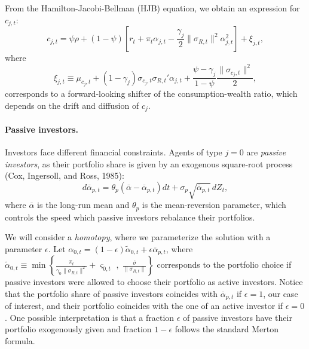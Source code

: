 \documentclass[12pt,english]{article}
\begin{document}
From the Hamilton-Jacobi-Bellman (HJB) equation, we obtain an expression for $c_{j,t}$:
\begin{equation}\label{eq:xi_j}
	c_{j,t} = \psi \rho + (1-\psi) \left[ r_t + \pi_t \alpha_{j,t} - \frac{\gamma_j}{2} \|\sigma_{R,t}\|^2 \alpha_{j,t}^2\right] + \xi_{j,t},
\end{equation}
where 
\begin{equation}\label{eq:shifter}
	\xi_{j,t} \equiv \mu_{c_j,t} + (1-\gamma_j)  \sigma_{c_j,t} \sigma_{R,t}' \alpha_{j,t} + \frac{\psi - \gamma_j}{1-\psi} \frac{\|\sigma_{c_j,t}\|^2}{2},
\end{equation} corresponds to a forward-looking shifter of the consumption-wealth ratio, which depends on the drift and diffusion of $c_j$.

\paragraph{Passive investors.} Investors face different financial constraints. Agents of type $j = 0 $ are \textit{passive investors}, as their portfolio share is given by an exogenous square-root process (Cox, Ingersoll, and Ross, 1985):
\begin{equation}\label{eq:alpha_p_process}
	d \overline{\alpha}_{p,t} = \theta_p (\overline{\alpha} - \overline{\alpha}_{p,t}) dt + \sigma_{p} \sqrt{\overline{\alpha}_{p,t}}\, d Z_t,
\end{equation}
where $\overline{\alpha}$ is the long-run mean and $\theta_p$ is the mean-reversion parameter, which controls the speed which passive investors rebalance their portfolios. 

We will consider a \textit{homotopy}, where we parameterize the solution with a parameter $\epsilon$. 
Let $\alpha_{0,t} = (1-\epsilon) \tilde{\alpha}_{0,t} + \epsilon \overline{\alpha}_{p,t}$, where 
$\tilde{\alpha}_{0,t} \equiv \min \left\{ \frac{\pi_t}{\gamma_0 \|\sigma_{R,t}\|^2}  + \varsigma_{0,t}\,\,, \,\,\frac{\overline{\sigma}}{\|\sigma_{R,t}\|} \right\}$ corresponds to the portfolio choice if passive investors were allowed to choose their portfolio as active investors. 
Notice that the portfolio share of passive investors coincides with $\overline{\alpha}_{p,t}$ if $\epsilon = 1$, our case of interest, and their portfolio coincides with the one of an active investor if $\epsilon = 0$. 
One possible interpretation is that a fraction $\epsilon$ of passive investors have their portfolio exogenously given and fraction $1-\epsilon$ follows the standard Merton formula. 
\end{document}
